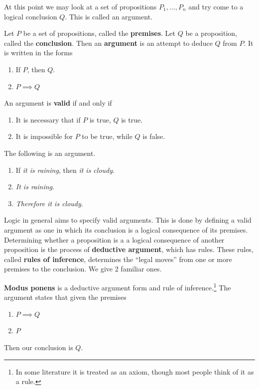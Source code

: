   At this point we may look at a set of propositions $P_1, \ldots, P_n$ and try come to a logical conclusion $Q$. This is called an argument. 

  \begin{definition}[Argument]
    \label{def:argument}
    Let $P$ be a set of propositions, called the \textbf{premises}. Let $Q$ be a proposition, called the \textbf{conclusion}. Then an \textbf{argument} is an attempt to deduce $Q$ from $P$. It is written in the forms 
    \begin{enumerate}
      \item If $P$, then $Q$.  
      \item $P \implies Q$
    \end{enumerate}
    An argument is \textbf{valid} if and only if  
    \begin{enumerate}
      \item It is necessary that if $P$ is true, $Q$ is true. 
      \item It is impossible for $P$ to be true, while $Q$ is false. 
    \end{enumerate}
  \end{definition}

  \begin{example}
    \label{ex:a-valid-argument}
    The following is an argument. 
    \begin{enumerate}
      \item If \textit{it is raining}, then \textit{it is cloudy}. 
      \item \textit{It is raining}. 
      \item \textit{Therefore it is cloudy}.
    \end{enumerate}
  \end{example} 

  Logic in general aims to specify valid arguments. This is done by defining a valid argument as one in which its conclusion is a logical consequence of its premises. Determining whether a proposition is a a logical consequence of another proposition is the process of \textbf{deductive argument}, which has rules. These rules, called \textbf{rules of inference}, determines the ``legal moves'' from one or more premises to the conclusion. We give 2 familiar ones. 

  \begin{definition}
    \label{def:modus-ponens}
    \textbf{Modus ponens} is a deductive argument form and rule of inference.\footnote{In some literature it is treated as an axiom, though most people think of it as a rule.} The argument states that given the premises
    \begin{enumerate}
      \item $P \implies Q$ 
      \item $P$
    \end{enumerate}
    Then our conclusion is $Q$. 
  \end{definition} 

